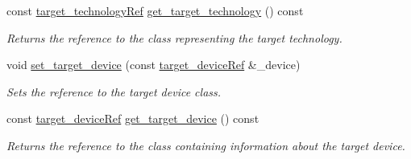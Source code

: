 \begin{DoxyCompactItemize}
const \hyperlink{target__technology_8hpp_a16af97aadc4eb998c2c9ec7fba5ccecd}{target\+\_\+technology\+Ref} \hyperlink{classtarget__manager_adc6562164208d0908e6eedd2a9655057}{get\+\_\+target\+\_\+technology} () const
\begin{DoxyCompactList}\small\item\em Returns the reference to the class representing the target technology. \end{DoxyCompactList}\item 
void \hyperlink{classtarget__manager_aa58abbb383e12ce69562d9c6916f471c}{set\+\_\+target\+\_\+device} (const \hyperlink{target__device_8hpp_acedb2b7a617e27e6354a8049fee44eda}{target\+\_\+device\+Ref} \&\+\_\+device)
\begin{DoxyCompactList}\small\item\em Sets the reference to the target device class. \end{DoxyCompactList}\item 
const \hyperlink{target__device_8hpp_acedb2b7a617e27e6354a8049fee44eda}{target\+\_\+device\+Ref} \hyperlink{classtarget__manager_a3e45c4d4d04291c6b30b9a9219a891f1}{get\+\_\+target\+\_\+device} () const
\begin{DoxyCompactList}\small\item\em Returns the reference to the class containing information about the target device. \end{DoxyCompactList}\end{DoxyCompactItemize}
